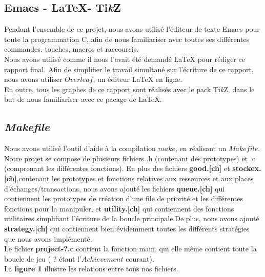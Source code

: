 \documentclass{article}
\newcommand{\tikzlogo}{Ti\emph{k}Z}
\begin{document}
    \subsection{Emacs - \LaTeX - \tikzlogo }
Pendant l'ensemble de ce projet, nous avons utilisé l'éditeur de texte Emacs pour toute la programmation C, afin de nous familiariser avec toutes ses différentes commandes, touches, macros et raccourcis.\\
Nous avons utilisé comme il nous l'avait été demandé LaTeX pour rédiger ce rapport final. Afin de simplifier le travail simultané sur l'écriture de ce rapport, nous avons utiliser $Overleaf$, un éditeur LaTeX en ligne.\\
En outre, tous les graphes de ce rapport sont réalisés avec le pack \tikzlogo, dans le but de nous familiariser avec ce pacage de \LaTeX.
    \subsection{\textit{Makefile}}
Nous avons utilisé l'outil d'aide à la compilation \textbf{$make$}, en réalisant un \textbf{$Makefile$}.
Notre projet se compose de plusieurs fichiers .h (contenant des prototypes) et .c (comprenant les différentes fonctions). En plus des fichiers \textbf{good.[ch]} et \textbf{stockex.[ch]},contenant les prototypes et fonctions relatives aux ressources et aux places d'échanges/transactions, nous avons ajouté les fichiers \textbf{queue.[ch]} qui contiennent les prototypes de création d'une file de priorité et les différentes fonctions pour la manipuler, et \textbf{utility.[ch]} qui contiennent des fonctions utilitaires simplifiant l'écriture de la boucle principale.De plus, nous avons ajouté \textbf{strategy.[ch]} qui contiennent bien évidemment toutes les différents stratégies que nous avons implémenté.\\
Le fichier \textbf{project-?.c} contient la fonction main, qui elle même contient toute la boucle de jeu ( ? étant l'$Achievement$ courant). \\
\newpage
La \textbf{figure 1} illustre les relations entre tous nos fichiers.
\end{document}

